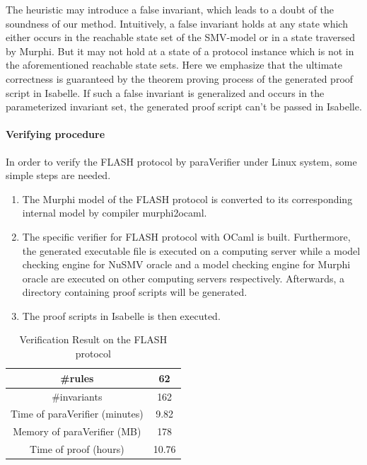 \documentclass{llncs-new}
\newcommand{\bedt}[1]{{\color{black}#1}}
\begin{document}
 The \bedt{heuristic} may introduce a false invariant, which leads to a doubt of the soundness of our method.  Intuitively, a  false invariant holds at any   state which either occurs in the reachable state set of the SMV-model or in a state traversed by Murphi. But it may not hold at a state of a protocol instance which is not in the aforementioned reachable state sets. Here we emphasize that the ultimate correctness is guaranteed by the theorem proving process of the generated proof script in Isabelle. If such a false invariant is generalized and occurs in the parameterized invariant set, the generated proof script can't be passed in Isabelle.

\vspace{-15pt}
\paragraph{Verifying \bedt{procedure}}  In order to verify the FLASH protocol by {\sf paraVerifier} under Linux system, some simple steps are needed.

\begin{enumerate}
\item The Murphi model of the FLASH protocol is converted to its corresponding internal model by compiler {\sf murphi2ocaml}.
\item The specific verifier for FLASH protocol with OCaml is built. Furthermore, the generated executable file is  executed on a computing server while a model checking engine for NuSMV oracle and a model checking engine for Murphi oracle are executed on other computing servers respectively. Afterwards, a directory containing proof scripts will be generated.
\item The proof scripts in Isabelle is then executed.
\end{enumerate}


\vspace{-20pt}
\begin{table}[!htbp]
  \centering
  \footnotesize
   \caption{Verification Result on the FLASH protocol}
  \label{tab:flashRes}
  \vspace{-5pt}
  \begin{tabular}{|c|c|}
    \hline
    \#rules & 62\\
    \hline
    \#invariants & 162\\
    \hline
    Time of {\sf paraVerifier} (minutes) & 9.82\\
    \hline
    Memory of {\sf paraVerifier} (MB) & 178\\
    \hline
    Time of proof (hours) & 10.76\\
    \hline
  \end{tabular}

\end{table}
\vspace{-20pt}
\end{document}

